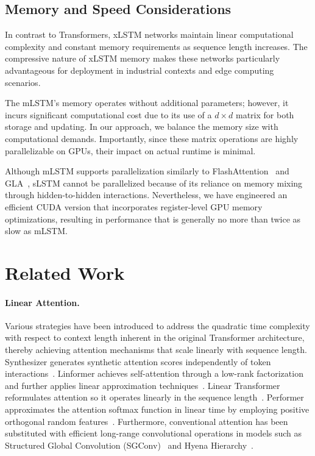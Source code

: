 \subsection{Memory and Speed Considerations}

In contrast to Transformers, xLSTM networks maintain linear computational complexity and constant memory requirements as sequence length increases. The compressive nature of xLSTM memory makes these networks particularly advantageous for deployment in industrial contexts and edge computing scenarios.

The mLSTM's memory operates without additional parameters; however, it incurs significant computational cost due to its use of a $d \times d$ matrix for both storage and updating. In our approach, we balance the memory size with computational demands. Importantly, since these matrix operations are highly parallelizable on GPUs, their impact on actual runtime is minimal.

Although mLSTM supports parallelization similarly to FlashAttention~\citep{Dao:22,Dao:23} and GLA~\citep{Yang:23arxiv}, sLSTM cannot be parallelized because of its reliance on memory mixing through hidden-to-hidden interactions. Nevertheless, we have engineered an efficient CUDA version that incorporates register-level GPU memory optimizations, resulting in performance that is generally no more than twice as slow as mLSTM.

\section{Related Work}
\label{sec:related}

\paragraph{Linear Attention.} Various strategies have been introduced to address the quadratic time complexity with respect to context length inherent in the original Transformer architecture, thereby achieving attention mechanisms that scale linearly with sequence length. Synthesizer generates synthetic attention scores independently of token interactions~\citep{Tay:20arxiv}. Linformer achieves self-attention through a low-rank factorization and further applies linear approximation techniques~\citep{Wang:20arxiv}. Linear Transformer reformulates attention so it operates linearly in the sequence length~\citep{Katharopoulos:20}. Performer approximates the attention softmax function in linear time by employing positive orthogonal random features~\citep{Choromanski:21}. Furthermore, conventional attention has been substituted with efficient long-range convolutional operations in models such as Structured Global Convolution (SGConv)~\citep{Li:22} and Hyena Hierarchy~\citep{Poli:23}.

